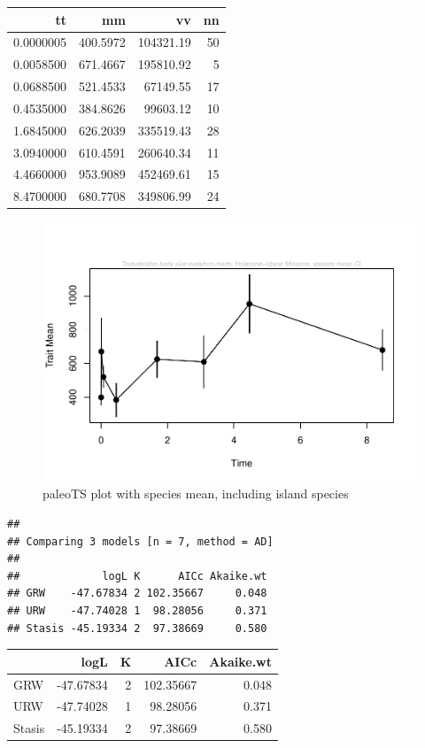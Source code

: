 \documentclass[]{article}
\begin{document}
\begin{longtable}[]{@{}rrrr@{}}
\toprule
tt & mm & vv & nn\tabularnewline
\midrule
\endhead
0.0000005 & 400.5972 & 104321.19 & 50\tabularnewline
0.0058500 & 671.4667 & 195810.92 & 5\tabularnewline
0.0688500 & 521.4533 & 67149.55 & 17\tabularnewline
0.4535000 & 384.8626 & 99603.12 & 10\tabularnewline
1.6845000 & 626.2039 & 335519.43 & 28\tabularnewline
3.0940000 & 610.4591 & 260640.34 & 11\tabularnewline
4.4660000 & 953.9089 & 452469.61 & 15\tabularnewline
8.4700000 & 680.7708 & 349806.99 & 24\tabularnewline
\bottomrule
\end{longtable}

\begin{figure}[htbp]
\centering
\includegraphics{MA_JJ_files/figure-latex/paleoTS plot with species mean, including island species-1.pdf}
\caption{paleoTS plot with species mean, including island species}
\end{figure}

\begin{verbatim}
## 
## Comparing 3 models [n = 7, method = AD]
## 
##             logL K      AICc Akaike.wt
## GRW    -47.67834 2 102.35667     0.048
## URW    -47.74028 1  98.28056     0.371
## Stasis -45.19334 2  97.38669     0.580
\end{verbatim}

\begin{longtable}[]{@{}lrrrr@{}}
\toprule
& logL & K & AICc & Akaike.wt\tabularnewline
\midrule
\endhead
GRW & -47.67834 & 2 & 102.35667 & 0.048\tabularnewline
URW & -47.74028 & 1 & 98.28056 & 0.371\tabularnewline
Stasis & -45.19334 & 2 & 97.38669 & 0.580\tabularnewline
\bottomrule
\end{longtable}
\end{document}
